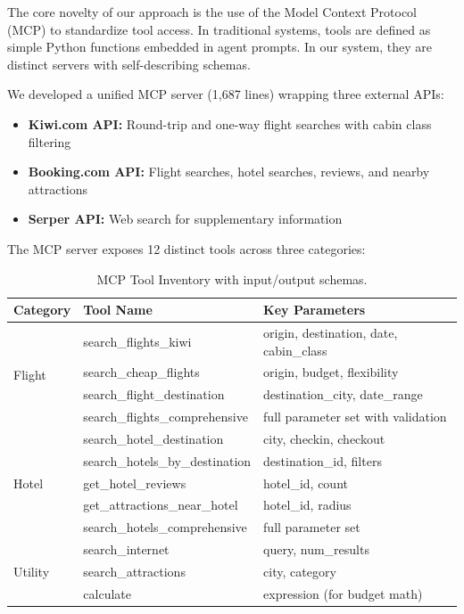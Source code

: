 \documentclass[preprint,review,12pt]{elsarticle}
\begin{document}
The core novelty of our approach is the use of the Model Context Protocol (MCP) to standardize tool access. In traditional systems, tools are defined as simple Python functions embedded in agent prompts. In our system, they are distinct servers with self-describing schemas.

We developed a unified MCP server (1,687 lines) wrapping three external APIs:

\begin{itemize}
    \item \textbf{Kiwi.com API:} Round-trip and one-way flight searches with cabin class filtering
    \item \textbf{Booking.com API:} Flight searches, hotel searches, reviews, and nearby attractions
    \item \textbf{Serper API:} Web search for supplementary information
\end{itemize}

The MCP server exposes 12 distinct tools across three categories:

\begin{table}[h]
\centering
\caption{MCP Tool Inventory with input/output schemas.}
\label{tab:mcp_tools}
\begin{tabular}{llp{6cm}}
\toprule
\textbf{Category} & \textbf{Tool Name} & \textbf{Key Parameters} \\
\midrule
\multirow{4}{*}{Flight} & search\_flights\_kiwi & origin, destination, date, cabin\_class \\
& search\_cheap\_flights & origin, budget, flexibility \\
& search\_flight\_destination & destination\_city, date\_range \\
& search\_flights\_comprehensive & full parameter set with validation \\
\midrule
\multirow{5}{*}{Hotel} & search\_hotel\_destination & city, checkin, checkout \\
& search\_hotels\_by\_destination & destination\_id, filters \\
& get\_hotel\_reviews & hotel\_id, count \\
& get\_attractions\_near\_hotel & hotel\_id, radius \\
& search\_hotels\_comprehensive & full parameter set \\
\midrule
\multirow{3}{*}{Utility} & search\_internet & query, num\_results \\
& search\_attractions & city, category \\
& calculate & expression (for budget math) \\
\bottomrule
\end{tabular}
\end{table}
\end{document}
